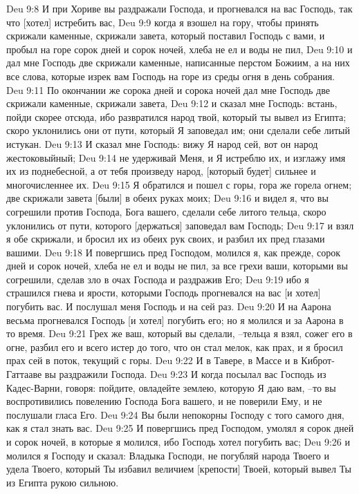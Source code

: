 Deu 9:8  И при Хориве вы раздражали Господа, и прогневался на вас Господь, так что [хотел] истребить вас,
Deu 9:9  когда я взошел на гору, чтобы принять скрижали каменные, скрижали завета, который поставил Господь с вами, и пробыл на горе сорок дней и сорок ночей, хлеба не ел и воды не пил,
Deu 9:10  и дал мне Господь две скрижали каменные, написанные перстом Божиим, а на них все слова, которые изрек вам Господь на горе из среды огня в день собрания.
Deu 9:11  По окончании же сорока дней и сорока ночей дал мне Господь две скрижали каменные, скрижали завета,
Deu 9:12  и сказал мне Господь: встань, пойди скорее отсюда, ибо развратился народ твой, который ты вывел из Египта; скоро уклонились они от пути, который Я заповедал им; они сделали себе литый истукан.
Deu 9:13  И сказал мне Господь: вижу Я народ сей, вот он народ жестоковыйный;
Deu 9:14  не удерживай Меня, и Я истреблю их, и изглажу имя их из поднебесной, а от тебя произведу народ, [который будет] сильнее и многочисленнее их.
Deu 9:15  Я обратился и пошел с горы, гора же горела огнем; две скрижали завета [были] в обеих руках моих;
Deu 9:16  и видел я, что вы согрешили против Господа, Бога вашего, сделали себе литого тельца, скоро уклонились от пути, которого [держаться] заповедал вам Господь;
Deu 9:17  и взял я обе скрижали, и бросил их из обеих рук своих, и разбил их пред глазами вашими.
Deu 9:18  И повергшись пред Господом, молился я, как прежде, сорок дней и сорок ночей, хлеба не ел и воды не пил, за все грехи ваши, которыми вы согрешили, сделав зло в очах Господа и раздражив Его;
Deu 9:19  ибо я страшился гнева и ярости, которыми Господь прогневался на вас [и хотел] погубить вас. И послушал меня Господь и на сей раз.
Deu 9:20  И на Аарона весьма прогневался Господь [и хотел] погубить его; но я молился и за Аарона в то время.
Deu 9:21  Грех же ваш, который вы сделали, --тельца я взял, сожег его в огне, разбил его и всего истер до того, что он стал мелок, как прах, и я бросил прах сей в поток, текущий с горы.
Deu 9:22  И в Тавере, в Массе и в Киброт-Гаттааве вы раздражили Господа.
Deu 9:23  И когда посылал вас Господь из Кадес-Варни, говоря: пойдите, овладейте землею, которую Я даю вам, --то вы воспротивились повелению Господа Бога вашего, и не поверили Ему, и не послушали гласа Его.
Deu 9:24  Вы были непокорны Господу с того самого дня, как я стал знать вас.
Deu 9:25  И повергшись пред Господом, умолял я сорок дней и сорок ночей, в которые я молился, ибо Господь хотел погубить вас;
Deu 9:26  и молился я Господу и сказал: Владыка Господи, не погубляй народа Твоего и удела Твоего, который Ты избавил величием [крепости] Твоей, который вывел Ты из Египта рукою сильною.
